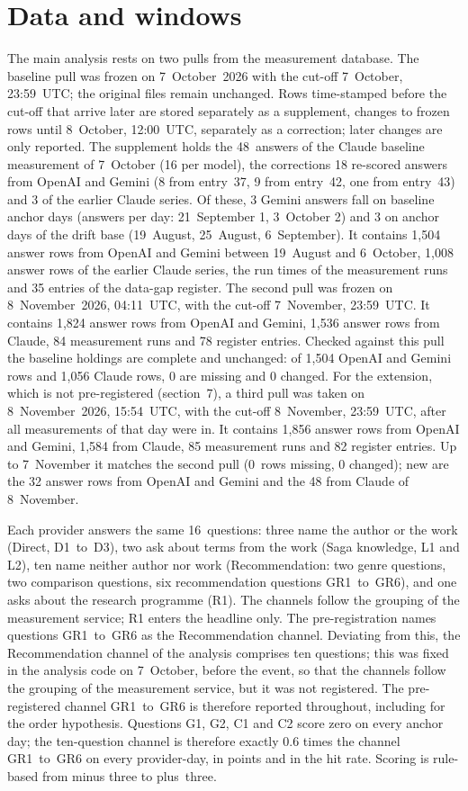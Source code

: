 \documentclass[11pt]{article}
\begin{document}
\section{Data and windows}

The main analysis rests on two pulls from the measurement database. The baseline pull was frozen on 7~October~2026 with the cut-off 7~October, 23:59~UTC; the original files remain unchanged. Rows time-stamped before the cut-off that arrive later are stored separately as a supplement, changes to frozen rows until 8~October, 12:00~UTC, separately as a correction; later changes are only reported. The supplement holds the 48~answers of the Claude baseline measurement of 7~October (16 per model), the corrections 18 re-scored answers from OpenAI and Gemini (8 from entry~37, 9 from entry~42, one from entry~43) and 3 of the earlier Claude series. Of these, 3 Gemini answers fall on baseline anchor days (answers per day: 21~September 1, 3~October 2) and 3 on anchor days of the drift base (19~August, 25~August, 6~September). It contains 1,504 answer rows from OpenAI and Gemini between 19~August and 6~October, 1,008 answer rows of the earlier Claude series, the run times of the measurement runs and 35 entries of the data-gap register. The second pull was frozen on 8~November~2026, 04:11~UTC, with the cut-off 7~November, 23:59~UTC. It contains 1,824 answer rows from OpenAI and Gemini, 1,536 answer rows from Claude, 84 measurement runs and 78 register entries. Checked against this pull the baseline holdings are complete and unchanged: of 1,504 OpenAI and Gemini rows and 1,056 Claude rows, 0 are missing and 0 changed. For the extension, which is not pre-registered (section~7), a third pull was taken on 8~November~2026, 15:54~UTC, with the cut-off 8~November, 23:59~UTC, after all measurements of that day were in. It contains 1,856 answer rows from OpenAI and Gemini, 1,584 from Claude, 85 measurement runs and 82 register entries. Up to 7~November it matches the second pull (0~rows missing, 0 changed); new are the 32 answer rows from OpenAI and Gemini and the 48 from Claude of 8~November.

Each provider answers the same 16~questions: three name the author or the work (Direct, D1~to~D3), two ask about terms from the work (Saga knowledge, L1 and L2), ten name neither author nor work (Recommendation: two genre questions, two comparison questions, six recommendation questions GR1~to~GR6), and one asks about the research programme (R1). The channels follow the grouping of the measurement service; R1 enters the headline only. The pre-registration names questions GR1~to~GR6 as the Recommendation channel. Deviating from this, the Recommendation channel of the analysis comprises ten questions; this was fixed in the analysis code on 7~October, before the event, so that the channels follow the grouping of the measurement service, but it was not registered. The pre-registered channel GR1~to~GR6 is therefore reported throughout, including for the order hypothesis. Questions G1, G2, C1 and C2 score zero on every anchor day; the ten-question channel is therefore exactly 0.6 times the channel GR1~to~GR6 on every provider-day, in points and in the hit rate. Scoring is rule-based from minus three to plus~\mbox{three.}
\end{document}
